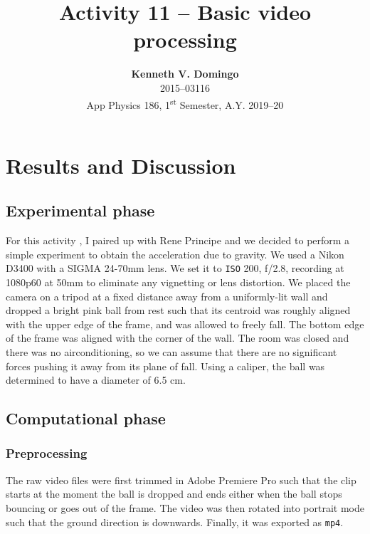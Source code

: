 \documentclass[12pt,a4paper]{article}
\newcommand{\activity}{Activity 11 -- Basic video processing}
\begin{document}
\title{\TitleFont \activity}
\author[ ]{\textbf{Kenneth V. Domingo} \\
2015--03116 \\
App Physics 186, 1\textsuperscript{st} Semester, A.Y. 2019--20}

\maketitle
\thispagestyle{titlestyle}

\section*{Results and Discussion}
\setcounter{section}{1}

\subsection{Experimental phase}
For this activity \cite{soriano}, I paired up with Rene Principe and we decided to perform a simple experiment to obtain the acceleration due to gravity. We used a Nikon D3400 with a SIGMA 24-70mm lens. We set it to \texttt{ISO} 200, f/2.8, recording at 1080p60 at 50mm to eliminate any vignetting or lens distortion. We placed the camera on a tripod at a fixed distance away from a uniformly-lit wall and dropped a bright pink ball from rest such that its centroid was roughly aligned with the upper edge of the frame, and was allowed to freely fall. The bottom edge of the frame was aligned with the corner of the wall. The room was closed and there was no airconditioning, so we can assume that there are no significant forces pushing it away from its plane of fall. Using a caliper, the ball was determined to have a diameter of 6.5 cm.

\subsection{Computational phase}
\subsubsection{Preprocessing}
The raw video files were first trimmed in Adobe Premiere Pro such that the clip starts at the moment the ball is dropped and ends either when the ball stops bouncing or goes out of the frame. The video was then rotated into portrait mode such that the ground direction is downwards. Finally, it was exported as \texttt{mp4}.
\end{document}
